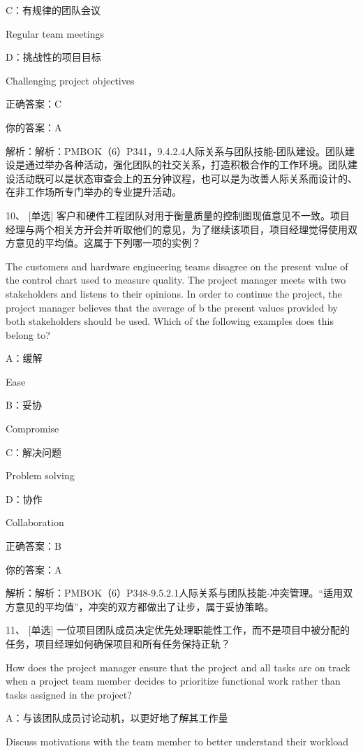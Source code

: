 C：有规律的团队会议

Regular team meetings

D：挑战性的项目目标

Challenging project objectives

正确答案：C

你的答案：A

解析：解析：PMBOK（6）P341，9.4.2.4人际关系与团队技能-团队建设。团队建设是通过举办各种活动，强化团队的社交关系，打造积极合作的工作环境。团队建设活动既可以是状态审查会上的五分钟议程，也可以是为改善人际关系而设计的、在非工作场所专门举办的专业提升活动。

10、 [单选] 客户和硬件工程团队对用于衡量质量的控制图现值意见不一致。项目经理与两个相关方开会并听取他们的意见，为了继续该项目，项目经理觉得使用双方意见的平均值。这属于下列哪一项的实例？

The customers and hardware engineering teams disagree on the present value of the control chart used to measure quality. The project manager meets with two stakeholders and listens to their opinions. In order to continue the project, the project manager believes that the average of b the present values provided by both stakeholders should be used. Which of the following examples does this belong to?

A：缓解

Ease

B：妥协

Compromise

C：解决问题

Problem solving

D：协作

Collaboration

正确答案：B

你的答案：A

解析：解析：PMBOK（6）P348-9.5.2.1人际关系与团队技能-冲突管理。“适用双方意见的平均值”，冲突的双方都做出了让步，属于妥协策略。

11、 [单选] 一位项目团队成员决定优先处理职能性工作，而不是项目中被分配的任务，项目经理如何确保项目和所有任务保持正轨？

How does the project manager ensure that the project and all tasks are on track when a project team member decides to prioritize functional work rather than tasks assigned in the project?

A：与该团队成员讨论动机，以更好地了解其工作量

Discuss motivations with the team member to better understand their workload

